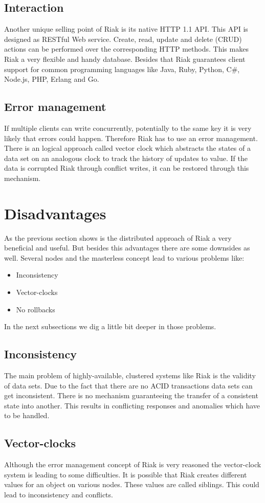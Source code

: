 \subsection{Interaction}
Another unique selling point of Riak is its native HTTP 1.1 API. This API is designed as RESTful Web service. Create, read, update and delete (CRUD) actions can be performed over the corresponding HTTP methods. This makes Riak a very flexible and handy database. 
Besides that Riak guarantees client support for common programming languages like Java, Ruby, Python, C\#, Node.js, PHP, Erlang and Go.  
\subsection{Error management}
If multiple clients can write concurrently, potentially to the same key it is very likely that errors could happen. Therefore Riak has to use an error management. There is an logical approach called vector clock which abstracts the states of a data set on an analogous clock to track the history of updates to value. If the data is corrupted Riak through conflict writes, it can be restored through this mechanism. 
\section{Disadvantages}
As the previous section shows is the distributed approach of Riak a very beneficial and useful. But besides this advantages there are some downsides as well. Several nodes and the masterless concept lead to various problems like:
 \begin{itemize}
 	\item Inconsistency
 	\item Vector-clocks
 	\item No rollbacks
 \end{itemize}
 In the next subsections we dig a little bit deeper in those problems. \cite{FHKoln.01.04.17}
 \subsection{Inconsistency}
 The main problem of highly-available, clustered systems like Riak is the validity of data sets. Due to the fact that there are no ACID transactions data sets can get inconsistent. There is no mechanism guaranteeing the transfer of a consistent state into another. This results in conflicting responses and anomalies which have to be handled.  
 \subsection{Vector-clocks}
 Although the error management concept of Riak is very reasoned the vector-clock system is leading to some difficulties. It is possible that Riak creates different values for an object on various nodes. These values are called siblings. This could lead to inconsistency and conflicts.
